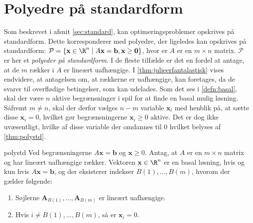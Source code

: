 \section{Polyedre på standardform}
\label{afsnit:fisk}
%
Som beskrevet i afsnit \ref{sec:standard}, kan optimeringsproblemer opskrives på standardform.
Dette korresponderer med polyedre, der ligeledes kan opskrives på standardform: 
$\mathcal{P}=\{ \mathbf{x} \in \R^n  \mid  A\mathbf{x}=\mathbf{b}, \mathbf{x} \geq \mathbf{0} \}$, hvor er $A$ er en $m \times n$ matrix.
$\mathcal{P}$ er her et \textit{polyeder på standardform}.
I de fleste tilfælde er det en fordel at antage, at de $m$ rækker i $A$ er lineært uafhængige.
I \ref{thm:julieerfantalastisk} vises endvidere, at antagelsen om, at rækkerne er uafhængige, kan foretages, da de svarer til overflødige betingelser, som kan udelades.
Som det ses i \ref{defn:basal}, skal der være $n$ aktive begrænsninger i spil for at finde en basal mulig løsning.
Såfremt $m \neq n$, skal der derfor vælges $n-m$ variable $\textbf{x}_i$ med henblik på, at sætte disse $\textbf{x}_i=0$, hvilket gør begrænsningerne $\textbf{x}_i \geq 0$ aktive.
Det er dog ikke uvæsentligt, hvilke af disse variable der omdannes til $0$ hvilket belyses af \ref{thm:polystd}.
%
\begin{thm}{}{polystd}
Ved begrænsningerne $A\textbf{x}=\mathbf{b}$ og $\textbf{x}\geq 0$.
Antag, at $A$ er en $m \times n$ matrix og har lineært uafhængige rækker.
Vektoren $\textbf{x} \in \R^n$ er en basal løsning, hvis og kun hvis $A\textbf{x}=\mathbf{b}$, og der eksisterer indekser $B(1),\ldots,B(m)$, hvorom der gælder følgende:
\begin{enumerate}[label=(\alph*)]
\item Søjlerne $\mathbf{A}_{B(1)},\ldots,\mathbf{A}_{B(m)}$ er lineært uafhængige.
\item Hvis $i \neq B(1),\ldots, B(m)$, så er $\textbf{x}_i=0$.
\end{enumerate}
\end{thm}
